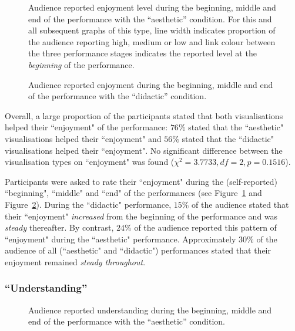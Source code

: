 \documentclass{sig-alternate}
\begin{document}
\begin{figure}
\centering
{}
\caption{Audience reported enjoyment level during the beginning, middle and end of the performance with the ``aesthetic'' condition. For this and all subsequent graphs of this type, line width indicates proportion of the audience reporting high, medium or low and link colour between the three performance stages indicates the reported level at the \textit{beginning} of the performance.}
\label{fig:aesthetic-enjoyment}
\end{figure}

\begin{figure}
\centering
{}
\caption{Audience reported enjoyment during the beginning, middle and end of the performance with the ``didactic'' condition.}
\label{fig:didactic-enjoyment}
\end{figure}

Overall, a large proportion of the participants stated that both visualisations helped their ``enjoyment" of the performance: $76\%$ stated that the ``aesthetic" visualisations helped their ``enjoyment" and $56\%$ stated that the ``didactic" visualisations helped their ``enjoyment". No significant difference between the visualisation types on ``enjoyment" was found ($\chi^2=3.7733,df=2,p=0.1516$).

Participants were asked to rate their ``enjoyment" during the (self-reported) ``beginning", ``middle" and ``end" of the performances (see Figure~\ref{fig:aesthetic-enjoyment} and Figure~\ref{fig:didactic-enjoyment}). During the ``didactic" performance, $15\%$ of the audience stated that their ``enjoyment" \textit{increased} from the beginning of the performance and was \textit{steady} thereafter. By contrast, $24\%$ of the audience reported this pattern of ``enjoyment" during the ``aesthetic" performance. Approximately $30\%$ of the audience of all (``aesthetic" and ``didactic") performances stated that their enjoyment remained \textit{steady throughout}.

\subsubsection{``Understanding''}

\begin{figure}
\centering
{}
\caption{Audience reported understanding during the beginning, middle and end of the performance with the ``aesthetic'' condition.}
\label{fig:aesthetic-understanding}
\end{figure}
\end{document}
